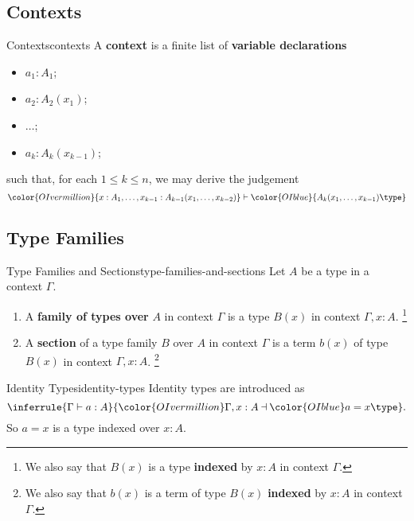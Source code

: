 \subsection{Contexts}\label{subsection-contexts}
\begin{definition}{Contexts}{contexts}%
    A \textbf{context} is a finite list of \textbf{variable declarations}
    \begin{itemize}
        \item $a_{1}:A_{1}$;
        \item $a_{2}:A_{2}(x_{1})$;
        \item $\ldots$;
        \item $a_{k}:A_{k}(x_{k-1})$;
    \end{itemize}
    such that, for each $1\leq k\leq n$, we may derive the judgement
    \[
        {\color{OIvermillion}{x:A_{1},\ldots,x_{k-1}:A_{k-1}(x_{1},\ldots,x_{k-2})}}%
        \vdash%
        {\color{OIblue}{A_{k}(x_{1},\ldots,x_{k-1})\type}}%
    \]%
\end{definition}
\subsection{Type Families}\label{subsection-type-families}
\begin{definition}{Type Families and Sections}{type-families-and-sections}%
    Let $A$ be a type in a context $\Gamma$.
    \begin{enumerate}
        \item\label{type-families-and-sections-type-families}A \textbf{family of types over} $A$ in context $\Gamma$ is a type $B(x)$ in context $\Gamma,x:A$.%
            \footnote{%
                We also say that $B(x)$ is a type \textbf{indexed} by $x:A$ in context $\Gamma$.
            }%
        \item\label{type-families-and-sections-sections}A \textbf{section} of a type family $B$ over $A$ in context $\Gamma$ is a term $b(x)$ of type $B(x)$ in context $\Gamma,x:A$.%
            \footnote{%
                We also say that $b(x)$ is a term of type $B(x)$ \textbf{indexed} by $x:A$ in context $\Gamma$.
                \par\vspace*{\TCBBoxCorrection}
            }%
    \end{enumerate}
\end{definition}
\begin{example}{Identity Types}{identity-types}%
    Identity types are introduced as
    \[
        \inferrule{\Gamma\vdash a:A}{{\color{OIvermillion}\Gamma,x:A}\mathbin{\dashv}{{\color{OIblue}a=x\type}}}.%
    \]%
    So $a=x$ is a type indexed over $x:A$.
\end{example}
